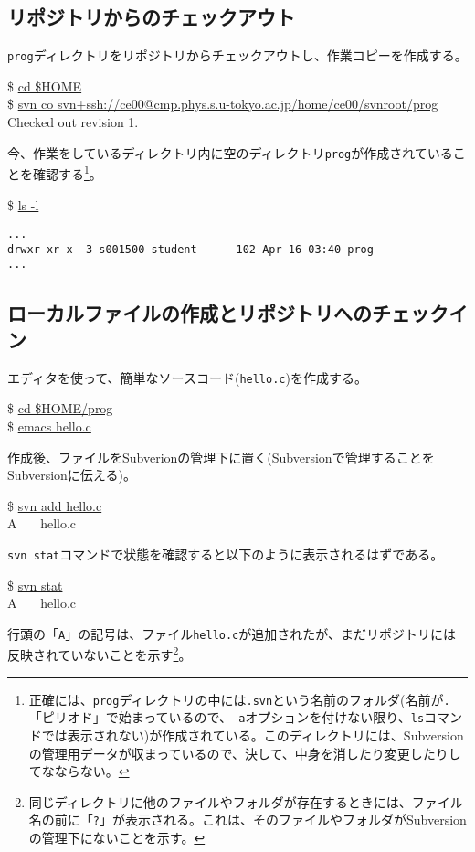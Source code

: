 \documentclass[a4j]{jsbook}
\newcommand{\prompt}{\$ }
\newenvironment{commandline2}{%
  \begin{tcolorbox}\tt%
}{%
  \end{tcolorbox}%
}
\begin{document}
\subsection{リポジトリからのチェックアウト}

{\tt prog}ディレクトリをリポジトリからチェックアウトし、作業コピーを作成する。
\begin{commandline2}
\prompt \underline{cd \$HOME} \\
\prompt \underline{svn co svn+ssh://ce00@cmp.phys.s.u-tokyo.ac.jp/home/ce00/svnroot/prog} \\
Checked out revision 1.
\end{commandline2} \noindent
今、作業をしているディレクトリ内に空のディレクトリ{\tt prog}が作成されていることを確認する\footnote{正確には、{\tt prog}ディレクトリの中には{\tt .svn}という名前のフォルダ(名前が{\tt .}「ピリオド」で始まっているので、{\tt -a}オプションを付けない限り、{\tt ls}コマンドでは表示されない)が作成されている。このディレクトリには、Subversionの管理用データが収まっているので、決して、中身を消したり変更したりしてなならない。}。
\begin{commandline2}
\prompt \underline{ls -l}
\vspace*{-.7em} 
\begin{verbatim}
...
drwxr-xr-x  3 s001500 student      102 Apr 16 03:40 prog
...
\end{verbatim}
\end{commandline2} \noindent

\subsection{ローカルファイルの作成とリポジトリへのチェックイン}

エディタを使って、簡単なソースコード({\tt hello.c})を作成する。
\begin{commandline2}
\prompt \underline{cd \$HOME/prog} \\
\prompt \underline{emacs hello.c}
\end{commandline2} \noindent
作成後、ファイルをSubverionの管理下に置く(Subversionで管理することをSubversionに伝える)。
\begin{commandline2}
\prompt \underline{svn add hello.c} \\
A \ \ \ hello.c
\end{commandline2} \noindent
{\tt svn stat}コマンドで状態を確認すると以下のように表示されるはずである。
\begin{commandline2}
\prompt \underline{svn stat} \\
A \ \ \ hello.c
\end{commandline2} \noindent
行頭の「{\tt A}」の記号は、ファイル{\tt hello.c}が追加されたが、まだリポジトリには反映されていないことを示す\footnote{同じディレクトリに他のファイルやフォルダが存在するときには、ファイル名の前に「{\tt ?}」が表示される。これは、そのファイルやフォルダがSubversionの管理下にないことを示す。}。
\end{document}

